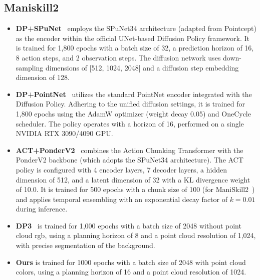 \documentclass[runningheads]{llncs}
\begin{document}
\subsection{Maniskill2~\cite{gu2023maniskill2}}
\begin{itemize}
\item \textbf{DP+SPuNet}~\cite{zhu2024point} employs the SPuNet34 architecture (adapted from Pointcept) as the encoder within the official UNet-based Diffusion Policy framework. It is trained for 1,800 epochs with a batch size of 32, a prediction horizon of 16, 8 action steps, and 2 observation steps. The diffusion network uses down-sampling dimensions of [512, 1024, 2048] and a diffusion step embedding dimension of 128.

\item \textbf{DP+PointNet}~\cite{zhu2024point} utilizes the standard PointNet encoder integrated with the Diffusion Policy. Adhering to the unified diffusion settings, it is trained for 1,800 epochs using the AdamW optimizer (weight decay 0.05) and OneCycle scheduler. The policy operates with a horizon of 16, performed on a single NVIDIA RTX 3090/4090 GPU.

\item \textbf{ACT+PonderV2}~\cite{zhu2024point} combines the Action Chunking Transformer with the PonderV2 backbone (which adopts the SPuNet34 architecture). The ACT policy is configured with 4 encoder layers, 7 decoder layers, a hidden dimension of 512, and a latent dimension of 32 with a KL divergence weight of 10.0. It is trained for 500 epochs with a chunk size of 100 (for ManiSkill2~\cite{gu2023maniskill2}) and applies temporal ensembling with an exponential decay factor of $k=0.01$ during inference.

\item \textbf{DP3}~\cite{ze20243d} is trained for 1,000 epochs with a batch size of 2048 without point cloud rgb, using a planning horizon of 8 and a point cloud resolution of 1,024, with precise segmentation of the background.

\item \textbf{Ours} is trained for 1000 epochs with a batch size of 2048 with point cloud colors, using a planning horizon of 16 and a point cloud resolution of 1024.
\end{itemize}









%
%


\end{document}
